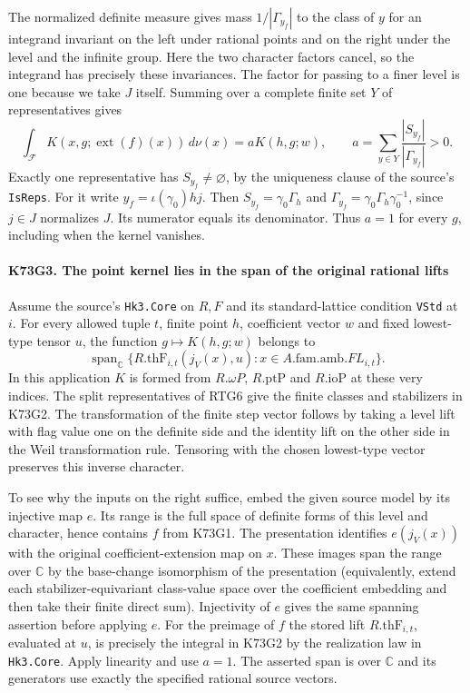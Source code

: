 The normalized definite measure gives mass $1/|\Gamma_{y_f}|$ to the
class of $y$ for an integrand invariant on the left under rational
points and on the right under the level and the infinite group.
Here the two character factors cancel, so the integrand has precisely
these invariances. The factor for passing to a finer level is one
because we take $J$ itself. Summing over a complete finite set $Y$
of representatives gives
\[
 \int_{\mathcal F} K(x,g;\operatorname{ext}(f)(x))\,d\nu(x)
       =a K(h,g;w),\qquad
 a=\sum_{y\in Y}\frac{|S_{y_f}|}{|\Gamma_{y_f}|}>0 .
\]
Exactly one representative has $S_{y_f}\ne\varnothing$, by the
uniqueness clause of the source's \texttt{IsReps}. For it write
$y_f=\iota(\gamma_0)h j$. Then $S_{y_f}=\gamma_0\Gamma_h$ and
$\Gamma_{y_f}=\gamma_0\Gamma_h\gamma_0^{-1}$, since $j\in J$
normalizes $J$. Its numerator equals its denominator. Thus $a=1$
for every $g$, including when the kernel vanishes.

\paragraph{K73G3. The point kernel lies in the span of the original rational lifts}
Assume the source's \texttt{Hk3.Core} on $R,F$ and its standard-lattice
condition \texttt{VStd} at $i$. For every allowed tuple $t$, finite
point $h$, coefficient vector $w$ and fixed lowest-type tensor $u$, the
function $g\mapsto K(h,g;w)$ belongs to
\[
 \operatorname{span}_{\mathbb C}
 \big\{R.\mathrm{thF}_{i,t}(j_V(x),u):
                    x\in A.\mathrm{fam}.\mathrm{amb}.FL_{i,t}\big\}.
\]
In this application $K$ is formed from $R.\omega P$, $R.\mathrm{ptP}$
and $R.\mathrm{ioP}$ at these very indices. The split representatives
of RTG6 give the finite classes and stabilizers in K73G2. The
transformation of the finite step vector follows by taking a level
lift with flag value one on the definite side and the identity lift
on the other side in the Weil transformation rule. Tensoring with
the chosen lowest-type vector preserves this inverse character.

To see why the inputs on the right suffice, embed the given source
model by its injective map $e$. Its range is the full space of
definite forms of this level and character, hence contains $f$ from
K73G1. The presentation identifies $e(j_V(x))$ with the original
coefficient-extension map on $x$. These images span the range over
$\mathbb C$ by the base-change isomorphism of the presentation
(equivalently, extend each stabilizer-equivariant class-value space
over the coefficient embedding and then take their finite direct sum).
Injectivity of $e$ gives the same spanning assertion before applying
$e$. For the preimage of $f$ the stored lift $R.\mathrm{thF}_{i,t}$,
evaluated at $u$, is precisely the integral in K73G2 by the
realization law in \texttt{Hk3.Core}. Apply linearity and use $a=1$. The asserted span is over $\mathbb C$ and its generators use
exactly the specified rational source vectors.

